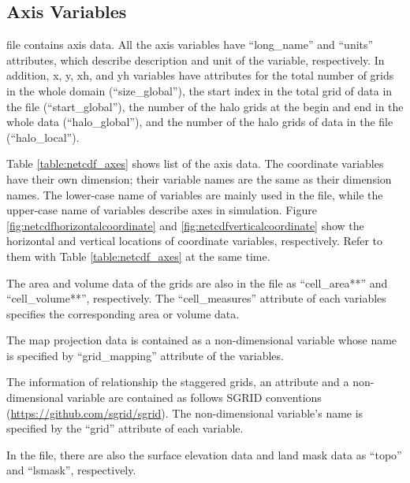 \subsection{Axis Variables}
\scalenetcdf file contains axis data.
All the axis variables have 
``long\_name'' and ``units'' attributes,
which describe description and unit of the variable, respectively.
In addition, x, y, xh, and yh variables 
have attributes for the total number of grids in the whole domain (``size\_global''),
the start index in the total grid of data in the file (``start\_global''),
the number of the halo grids at the begin and end in the whole data (``halo\_global''),
and the number of the halo grids of data in the file (``halo\_local'').

Table \ref{table:netcdf_axes} shows list of the axis data.
The coordinate variables have their own dimension; their variable names are the same as their dimension names.
The lower-case name of variables are mainly used in the file, 
while the upper-case name of variables describe axes in simulation.
Figure \ref{fig:netcdfhorizontalcoordinate} and \ref{fig:netcdfverticalcoordinate} show 
the horizontal and vertical locations of coordinate variables,
respectively.
Refer to them with Table \ref{table:netcdf_axes} at the same time.

The area and volume data of the grids are also in the file as ``cell\_area**'' and ``cell\_volume**'', respectively.
The ``cell\_measures'' attribute of each variables specifies the corresponding area or volume data.

The map projection data is contained as a non-dimensional variable whose name is specified by ``grid\_mapping'' attribute of the variables.

The information of relationship the staggered grids, an attribute and a non-dimensional variable are contained as follows SGRID conventions (\url{https://github.com/sgrid/sgrid}).
The non-dimensional variable's name is specified by the ``grid'' attribute of each variable.

In the file, there are also the surface elevation data and land mask data as ``topo'' and ``lsmask'', respectively.



